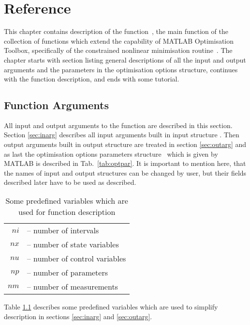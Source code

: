 \chapter{Reference}
\label{cha:reference}


This chapter contains description of the function~, the
main function of the collection of functions which extend the
capability of MATLAB Optimisation Toolbox, specifically of the
constrained nonlinear minimisation routine~. The chapter
starts with section listing general descriptions of all the input and
output arguments and the parameters in the optimisation options
structure, continues with the function description, and ends with some 
tutorial. 

\section{Function Arguments}
\label{sec:funarg}

All input and output arguments to the  function are
described in this section. Section \ref{sec:inarg} describes all input
arguments built in input structure . Then output
arguments built in output structure  are treated in
section \ref{sec:outarg} and as last the optimisation options parameters
structure~ which is given by MATLAB is described in
Tab.~\ref{tab:optpar}. It is important to mention here, that the names
of input and output structures can be changed by user, but their fields
described later have to be used as described. 

\begin{table}[ht]
\begin{center}
\begin{tabular}{r p{10cm}}
\hline
$ni$ &-- number of intervals\\
$nx$ &-- number of state variables\\
$nu$ &-- number of control variables\\
$np$ &-- number of parameters\\
$nm$ &-- number of measurements\\
\hline
\end{tabular}
\caption[Predefined variables]{Some predefined variables which are used for
  function description}\label{tab:shortcuts}
\end{center}
\end{table}

Table \ref{tab:shortcuts} describes some predefined variables which
are used to simplify  description in sections
\ref{sec:inarg} and \ref{sec:outarg}. 

